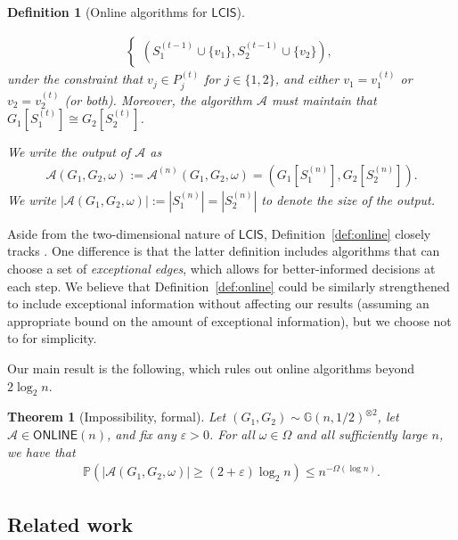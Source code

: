 \documentclass[11pt]{article}
\theoremstyle{plain}
\newtheorem{theorem}{Theorem}
\newtheorem{definition}{Definition}
\theoremstyle{definition}
\theoremstyle{remark}
\newcommand{\Gnhalf}{\mathbb{G}(n,1/2)}
\newcommand{\eps}{\varepsilon}
\newcommand{\MCS}{\mathsf{LCIS}}
\newcommand{\Alg}{\mathcal{A}}
\newcommand{\online}{\mathsf{ONLINE}}
\renewcommand{\Pr}{\mathbb{P}}
\begin{document}
\begin{definition}[Online algorithms for $\MCS$]
\begin{enumerate}
\begin{align}
\begin{cases}
                \left(S^{(t-1)}_1 \cup \{v_1\}, S^{(t-1)}_2 \cup \{v_2\}\right),
            \end{cases}
        \end{align}
        under the constraint that $v_j \in P^{(t)}_j$ for $j \in \{1,2\}$, and 
        either $v_{1} = v_{1}^{(t)}$ 
        or $v_{2} = v_{2}^{(t)}$ 
        (or both). 
        Moreover, the algorithm $\Alg$ must maintain that $G_1\left[S^{(t)}_1\right] \cong G_2\left[S^{(t)}_2\right]$.
    \end{enumerate}
    We write the output of $\Alg$ as
    \begin{align}
        \Alg(G_{1}, G_{2}, \omega) := \Alg^{(n)}(G_{1}, G_{2}, \omega) = \left(G_1\left[S^{(n)}_1\right], G_2\left[S^{(n)}_2\right]\right).
    \end{align}
    We write $|\Alg(G_{1}, G_{2}, \omega)| := \left|S^{(n)}_1\right| = \left|S^{(n)}_2\right|$ to denote the size of the output. 
\end{definition}

Aside from the two-dimensional nature of $\MCS$, Definition~\ref{def:online} closely tracks \cite[Definition~2.1]{GKW25}. One difference is that the latter definition includes algorithms that can choose a set of \emph{exceptional edges}, which allows for better-informed decisions at each step. We believe that Definition~\ref{def:online} could be similarly strengthened to include exceptional information without affecting our results (assuming an appropriate bound on the amount of exceptional information), but we choose not to for simplicity.

Our main result is the following, which rules out online algorithms beyond $2 \log_2 n$.

\begin{theorem}[Impossibility, formal]\label{thm:impossibility-formal}
    Let $(G_1, G_2) \sim \Gnhalf^{\otimes 2}$, let $\Alg \in \online(n)$, and fix any $\eps > 0$. For all $\omega \in \Omega$ and all sufficiently large $n$, we have that 
    \begin{align}
        \Pr\left(|\Alg(G_1, G_2, \omega)| \geq (2 + \eps)\log_2 n \right) \leq n^{-\Omega(\log n)}.
    \end{align} 
\end{theorem}


\subsection{Related work}
\end{document}

